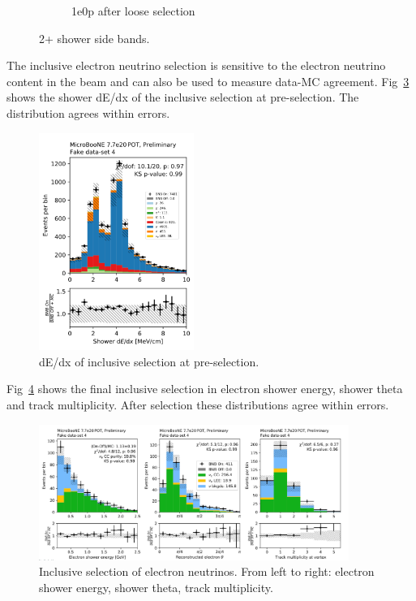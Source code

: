 \begin{figure}[H]
\begin{center}
\begin{subfigure}[b]{0.45\textwidth}
    \caption{\label{fig:fakedata:set4:2shr0p} 1e0p after loose selection}
    \end{subfigure}
\caption{\label{fig:fakedata:set4:2shr} 2+ shower side bands.}
\end{center}
\end{figure}

The inclusive electron neutrino selection is sensitive to the electron neutrino content in the beam and can also be used to measure data-MC agreement.  Fig~\ref{fig:fakedata:set4:inc_presel} shows the shower dE/dx of the inclusive selection at pre-selection.  The distribution agrees within errors.   

\begin{figure}[H]
\begin{center}
\includegraphics[width=0.45\textwidth]{Fakedata/set4/inc_presel.pdf}
\caption{\label{fig:fakedata:set4:inc_presel} dE/dx of inclusive selection at pre-selection.}
\end{center}
\end{figure}

Fig~\ref{fig:fakedata:set4:inc_postsel} shows the final inclusive selection in electron shower energy, shower theta and track multiplicity.  After selection these distributions agree within errors.

\begin{figure}[H]
\begin{center}
\includegraphics[width=0.9\textwidth]{Fakedata/set4/incl_postsel.pdf}
\caption{\label{fig:fakedata:set4:inc_postsel} Inclusive selection of electron neutrinos. From left to right: electron shower energy, shower theta, track multiplicity.}
\end{center}
\end{figure}


